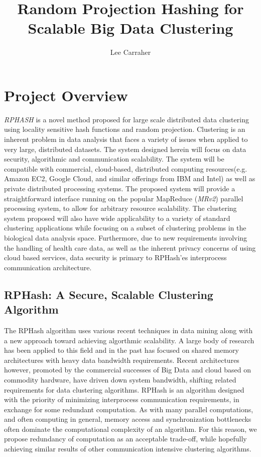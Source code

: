 \documentclass[a4paper,10pt]{article}
\title{Random Projection Hashing for Scalable Big Data Clustering}
\author{Lee Carraher}
\begin{document}
\maketitle

\begin{abstract}



\end{abstract}
\section{Project Overview}
\emph{RPHASH} is a
novel method proposed for large scale distributed data clustering using locality sensitive
hash functions and random projection.
Clustering is an inherent problem in data analysis that faces a variety of issues when
applied to very large, distributed datasets.
The system designed herein will focus on data security, algorithmic and communication
scalability. The system 
will be compatible with commercial, cloud-based, distributed computing
resources(e.g.
Amazon EC2, Google Cloud, and similar offerings from IBM and Intel) as well as private
distributed processing systems. 
The proposed system will provide a straightforward interface
running on the popular MapReduce (\emph{MRv2})\cite{mapreduce} 
parallel processing system, to allow for arbitrary resource scalability.
The clustering system proposed will also have wide applicability to a variety of standard clustering
applications while focusing on a subset of clustering problems in the 
biological data analysis space.
Furthermore, due to new requirements involving the handling of health care data, as well as
the inherent privacy concerns of using cloud based services, data security is primary to RPHash'es
interprocess communication architecture.\\


\subsection{RPHash: A Secure, Scalable Clustering Algorithm}
The RPHash algorithm uses various recent techniques in data mining along with 
a new approach toward achieving algorthmic scalability. A large body of research 
has been applied to this field and in the past has focused on shared 
memory architectures with heavy data bandwidth requirements. Recent
architectures however, promoted by the commercial successes of Big Data and cloud based
on commodity hardware, have driven down system bandwidth, 
shifting related requirements for data clustering algorithms.
RPHash is an algorithm designed with the priority of
minimizing interprocess communication requirements, in exchange for
some redundant computation. As with many parallel computations, and often computing
in general, memory access and synchronization bottlenecks often dominate the computational
complexity of an algorithm. For this reason, we propose redundancy of computation as
an acceptable trade-off, while hopefully achieving similar results of other communication
intensive clustering algorithms.\\
\end{document}
